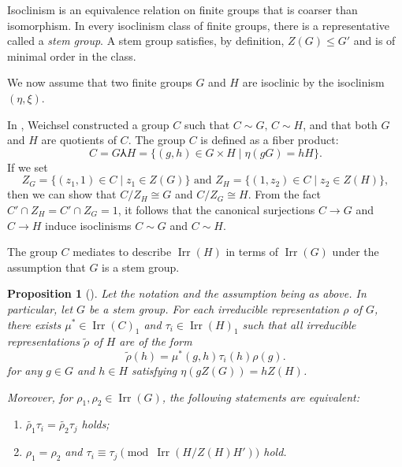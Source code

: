 \documentclass[a4paper,12pt]{article}
\newtheorem{proposition}[theorem]{Proposition}
\theoremstyle{definition}
\theoremstyle{remark}
\DeclareMathOperator{\irr}{Irr}
\numberwithin{equation}{section}
\begin{document}
Isoclinism is an equivalence relation on finite groups that is coarser than isomorphism.
In every isoclinism class of finite groups, there is a representative called a \emph{stem group}.
A stem group satisfies, by definition, $Z(G) \le  G'$ and is of minimal order in the class.

We now assume that two finite groups $G$ and $H$ are isoclinic 
by the isoclinism $(\eta, \xi)$.

In \cite{MR0148734}, Weichsel constructed a group $C$ such that $C \sim G, \, C \sim H$,
and that both $G$ and $H$ are quotients of $C$.
The group $C$ is defined as a fiber product:
\begin{equation}  \label{eq:4.1}
C  = G \Yup H  =\{ (g,h) \in  G \times H \mid \eta (gG) = hH  \}.
\end{equation}
If we set
\[ Z_G = \{ (z_1, 1) \in C \mid z_1 \in Z (G) \} \text{ and }
Z_H = \{ (1, z_2) \in C \mid z_2 \in Z (H) \},
\]
then we can show that $C/Z_{H} \cong G$ and $C/Z_{G} \cong  H$.
From the fact $C' \cap Z_{H} = C' \cap Z_{G}=1$, it follows that 
the canonical surjections $C \rightarrow G$ and $C \rightarrow H$
induce isoclinisms $C \sim G$ and $C \sim H$.

The group $C$ mediates to describe $\irr (H)$ in terms of $\irr (G)$ under the assumption that
$G$ is a stem group. 


\begin{proposition}[] \label{prop:4.2}
Let the notation and the assumption being as above. 
In particular, let $G$ be a stem group.
For each irreducible representation $\rho $ of $G$, 
there exists $\mu^* \in \irr (C)_1$ and 
$ \tau_i \in \irr (H)_1$ such that all irreducible representations
$\tilde{\rho} $ of $H$ are of the form
\begin{equation} \label{eq:4.2}
\tilde{\rho} (h) = \mu^* (g , h) \tau_i (h) \rho (g). 
\end{equation}
for any $g \in G$ and $h \in H$ satisfying $\eta (g Z(G)) = h Z(H)$.

Moreover, for $\rho_1, \rho_2 \in \irr (G)$, the following statements are equivalent: 
\begin{enumerate}
\item $\tilde{\rho_1} \tau_i =\tilde{\rho_2} \tau_j$ holds;
\item $\rho_1= \rho_2$ and $\tau_i \equiv \tau_j \pmod{\irr (H/Z(H)H')}$ hold.
\end{enumerate}
\end{proposition}
\end{document}
